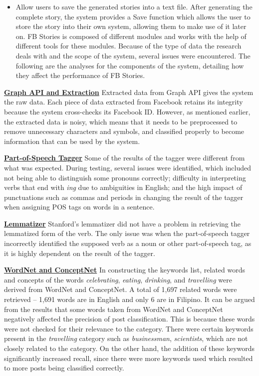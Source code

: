 \begin{itemize}
	\item Allow users to save the generated stories into a text file. \newline\newline
	After generating the complete story, the system provides a Save function which allows the user to store the story into their own system, allowing them to make use of it later on. \newline\newline
	FB Stories is composed of different modules and works with the help of different tools for these modules. Because of the type of data the research deals with and the scope of the system, several issues were encountered. The following are the analyses for the components of the system, detailing how they affect the performance of FB Stories. \newline\newline
\end{itemize}

\underline{\textbf{Graph API and Extraction}}
Extracted data from Graph API gives the system the raw data. Each piece of data extracted from Facebook retains its integrity because the system cross-checks its Facebook ID. However, as mentioned earlier, the extracted data is noisy, which means that it needs to be preprocessed to remove unnecessary characters and symbols, and classified properly to become information that can be used by the system.

\underline{\textbf{Part-of-Speech Tagger}}
Some of the results of the tagger were different from what was expected. During testing, several issues were identified, which included not being able to distinguish some pronouns correctly; difficulty in interpreting verbs that end with \textit{ing} due to ambiguities in English; and the high impact of punctuations such as commas and periods in changing the result of the tagger when assigning POS tags on words in a sentence.

\underline{\textbf{Lemmatizer}}
Stanford’s lemmatizer did not have a problem in retrieving the lemmatized form of the verb. The only issue was when the part-of-speech tagger incorrectly identified the supposed verb as a noun or other part-of-speech tag, as it is highly dependent on the result of the tagger.

\underline{\textbf{WordNet and ConceptNet}}
In constructing the keywords list, related words and concepts of the words \textit{celebrating}, \textit{eating}, \textit{drinking}, and \textit{travelling} were derived from WordNet and ConceptNet. A total of 1,697 related words were retrieved -- 1,691 words are in English and only 6 are in Filipino. It can be argued from the results that some words taken from WordNet and ConceptNet negatively affected the precision of post classification. This is because these words were not checked for their relevance to the category. There were certain keywords present in the \textit{travelling} category such as \textit{businessman}, \textit{scientists}, which are not closely related to the category. On the other hand, the addition of these keywords significantly increased recall, since there were more keywords used which resulted to more posts being classified correctly.

